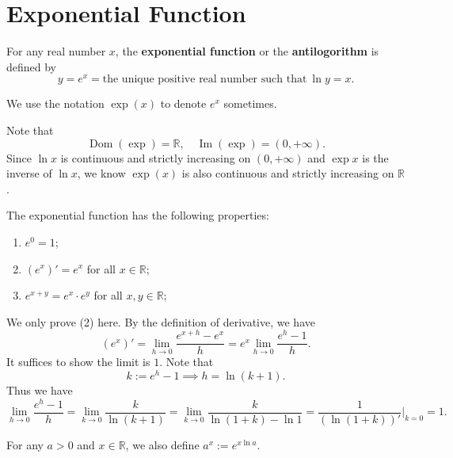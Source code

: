 	\section{Exponential Function}
	\begin{definitionenv}
		For any real number $x$, the \textbf{exponential function} or the \textbf{antilogorithm} is defined by
		\[
		y = e^x = \text{the unique positive real number such that}\ \ln y = x.
		\]
	\end{definitionenv}
	\begin{notationenv}
		We use the notation $\exp(x)$ to denote $e^x$ sometimes.
	\end{notationenv}
	\begin{remarkenv}
		Note that
		\[
		\operatorname{Dom} (\exp) = \mathbb{R}, \quad \operatorname{Im} (\exp) = (0, +\infty).
		\]
		Since $\ln x$ is continuous and strictly increasing on $(0, +\infty)$ and $\exp x$ is the inverse of $\ln x$, we know $\exp(x)$ is also continuous and strictly increasing on $\mathbb{R}$.
	\end{remarkenv}
	\begin{theoremenv}
		The exponential function has the following properties:
		\begin{enumerate}
			\item [(1)] $e^0 = 1$;
			\item [(2)] $(e^x)' = e^x$ for all $x\in \mathbb{R}$;
			\item [(3)] $e^{x+y} = e^x \cdot e^y$ for all $x,y\in \mathbb{R}$;
		\end{enumerate}
	\end{theoremenv}
	\begin{proofenv}
		We only prove (2) here. By the definition of derivative, we have
		\[
		(e^x)' = \lim_{h\to 0} \frac{e^{x+h} - e^x}{h} = e^x \lim_{h\to 0} \frac{e^h - 1}{h}.
		\]
		It suffices to show the limit is $1$. Note that
		\[
		k := e^h - 1 \implies h = \ln (k+1).
		\]
		Thus we have
		\[
		\lim_{h\to 0} \frac{e^h - 1}{h} = \lim_{k\to 0} \frac{k}{\ln (k+1)} = \lim_{k\to 0} \frac{k}{\ln (1+k) - \ln 1} = \frac{1}{\left( \ln (1+k) \right)'}\Big|_{k=0} = 1.
		\]
	\end{proofenv}
	\begin{definitionenv}
		For any $a>0$ and $x\in \mathbb{R}$, we also define $a^x := e^{x \ln a}$.
	\end{definitionenv}

